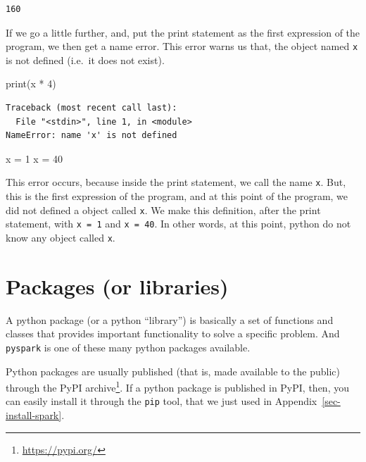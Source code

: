 \documentclass[
  11pt,
  letterpaper,
  DIV=11,
  numbers=noendperiod]{scrreprt}
\newenvironment{Shaded}{\begin{snugshade}}{\end{snugshade}}
\newcommand{\BuiltInTok}[1]{\textcolor[rgb]{0.00,0.23,0.31}{#1}}
\newcommand{\DecValTok}[1]{\textcolor[rgb]{0.68,0.00,0.00}{#1}}
\newcommand{\NormalTok}[1]{\textcolor[rgb]{0.00,0.23,0.31}{#1}}
\newcommand{\OperatorTok}[1]{\textcolor[rgb]{0.37,0.37,0.37}{#1}}
\begin{document}
\begin{verbatim}
160
\end{verbatim}

If we go a little further, and, put the print statement as the first
expression of the program, we then get a name error. This error warns us
that, the object named \texttt{x} is not defined (i.e.~it does not
exist).

\begin{Shaded}
\begin{Highlighting}[]
\BuiltInTok{print}\NormalTok{(x }\OperatorTok{*} \DecValTok{4}\NormalTok{)}
\end{Highlighting}
\end{Shaded}

\begin{verbatim}
Traceback (most recent call last):
  File "<stdin>", line 1, in <module>
NameError: name 'x' is not defined
\end{verbatim}

\begin{Shaded}
\begin{Highlighting}[]
\NormalTok{x }\OperatorTok{=} \DecValTok{1}
\NormalTok{x }\OperatorTok{=} \DecValTok{40}
\end{Highlighting}
\end{Shaded}

This error occurs, because inside the print statement, we call the name
\texttt{x}. But, this is the first expression of the program, and at
this point of the program, we did not defined a object called
\texttt{x}. We make this definition, after the print statement, with
\texttt{x\ =\ 1} and \texttt{x\ =\ 40}. In other words, at this point,
python do not know any object called \texttt{x}.

\hypertarget{packages-or-libraries}{%
\section{Packages (or libraries)}\label{packages-or-libraries}}

A python package (or a python ``library'') is basically a set of
functions and classes that provides important functionality to solve a
specific problem. And \texttt{pyspark} is one of these many python
packages available.

Python packages are usually published (that is, made available to the
public) through the PyPI archive\footnote{\url{https://pypi.org/}}. If a
python package is published in PyPI, then, you can easily install it
through the \texttt{pip} tool, that we just used in
Appendix~\ref{sec-install-spark}.
\end{document}
